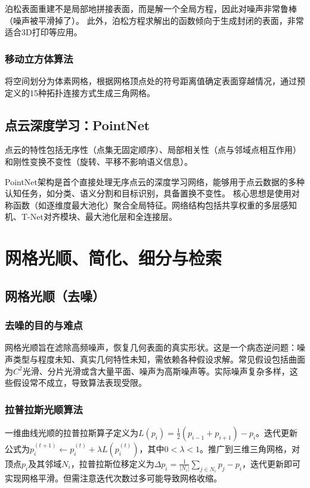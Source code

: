 \documentclass[12pt]{article}
\begin{document}
泊松表面重建不是局部地拼接表面，而是解一个全局方程，因此对噪声非常鲁棒（噪声被平滑掉了）。
此外，泊松方程求解出的函数倾向于生成封闭的表面，非常适合3D打印等应用。

\subsubsection{移动立方体算法}
将空间划分为体素网格，根据网格顶点处的符号距离值确定表面穿越情况，通过预定义的15种拓扑连接方式生成三角网格。

\subsection{点云深度学习：PointNet}

点云的特性包括无序性（点集无固定顺序）、局部相关性（点与邻域点相互作用）和刚性变换不变性（旋转、平移不影响语义信息）。

PointNet架构是首个直接处理无序点云的深度学习网络，能够用于点云数据的多种认知任务，如分类、语义分割和目标识别，具备置换不变性。
核心思想是使用对称函数（如逐维度最大池化）聚合全局特征。网络结构包括共享权重的多层感知机、T-Net对齐模块、最大池化层和全连接层。

\newpage

\section{网格光顺、简化、细分与检索}

\subsection{网格光顺（去噪）}

\subsubsection{去噪的目的与难点}
网格光顺旨在滤除高频噪声，恢复几何表面的真实形状。这是一个病态逆问题：噪声类型与程度未知、真实几何特性未知，需依赖各种假设求解。常见假设包括曲面为$C^2$光滑、分片光滑或含大量平面、噪声为高斯噪声等。实际噪声复杂多样，这些假设常不成立，导致算法表现受限。

\subsubsection{拉普拉斯光顺算法}
一维曲线光顺的拉普拉斯算子定义为$L(p_i) = \frac{1}{2}(p_{i-1} + p_{i+1}) - p_i$。迭代更新公式为$p_i^{(t+1)} \leftarrow p_i^{(t)} + \lambda L(p_i^{(t)})$，其中$0 < \lambda < 1$。推广到三维三角网格，对顶点$p_i$及其邻域$N_i$，拉普拉斯位移定义为$\Delta p_i = \frac{1}{|N_i|} \sum_{j \in N_i} p_j - p_i$，迭代更新即可实现网格平滑。但需注意迭代次数过多可能导致网格收缩。
\end{document}
